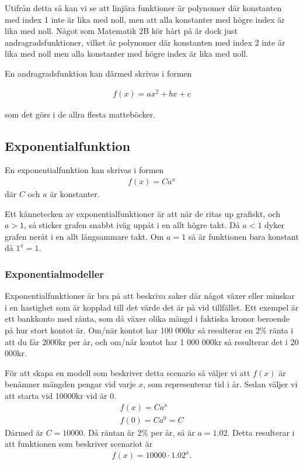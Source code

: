 Utifrån detta så kan vi se att linjära funktioner är polynomer där konstanten med index 1 inte är lika med noll, men att alla konstanter med högre index är lika med noll. Något som Matematik 2B kör hårt på är dock just andragradsfunktioner, vilket är polynomer där konstanten med index 2 inte är lika med noll men alla konstanter med högre index är lika med noll.

En andragradsfunktion kan därmed skrivas i formen

\begin{align}
	f(x) = ax^2 + bx + c
\end{align}

som det görs i de allra flesta matteböcker.

\newpage
\subsection{Exponentialfunktion}

\begin{definition}
	En exponentialfunktion kan skrivas i formen
	\begin{align}
		f(x)=Ca^x
	\end{align}
	där $C$ och $a$ är konstanter.
 \end{definition}
 

Ett kännetecken av exponentialfunktioner är att när de ritas up grafiskt, och $a > 1$, så sticker grafen snabbt iväg uppåt i en allt högre takt. Då $a < 1$ dyker grafen neråt i en allt långsammare takt. Om $a=1$ så är funktionen bara konstant då $1^x=1$.

\subsubsection{Exponentialmodeller}

Exponentialfunktioner är bra på att beskriva saker där något växer eller minskar i en hastighet som är kopplad till det värde det är på vid tillfället. Ett exempel är ett bankkonto med ränta, som då växer olika mängd i faktiska kronor beroende på hur stort kontot är. Om/när kontot har 100 000kr så resulterar en 2\% ränta i att du får 2000kr per år, och om/när kontot har 1 000 000kr så resulterar det i 20 000kr.

För att skapa en modell som beskriver detta scenario så väljer vi att $f(x)$ är benämner mängden pengar vid varje $x$, som representerar tid i år. Sedan väljer vi att starta vid 10000kr vid år 0.
\begin{align}
	f(x)=Ca^x \\
	f(0)=Ca^0 = C
\end{align}
Därmed är $C = 10000$. Då räntan är 2\% per år, så är $a=1.02$. Detta resulterar i att funktionen som beskriver scenariot är
\begin{align}
	f(x)=10000\cdot1.02^x.
\end{align}


